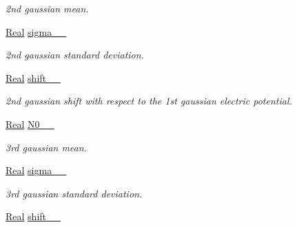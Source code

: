 \begin{DoxyCompactItemize}
\begin{DoxyCompactList}\small\item\em 2nd gaussian mean. \end{DoxyCompactList}\item 
\hypertarget{classParamList_a3ead6e4cc08dc0320e0b98c29e6d9337}{\hyperlink{typedefs_8h_a060b837c3b4486ee35317744156f3da2}{Real} \hyperlink{classParamList_a3ead6e4cc08dc0320e0b98c29e6d9337}{sigma\-\_\-\_\-}}\label{classParamList_a3ead6e4cc08dc0320e0b98c29e6d9337}

\begin{DoxyCompactList}\small\item\em 2nd gaussian standard deviation. \end{DoxyCompactList}\item 
\hypertarget{classParamList_a0f5e1e6350aeec57d0b7dacba5d86230}{\hyperlink{typedefs_8h_a060b837c3b4486ee35317744156f3da2}{Real} \hyperlink{classParamList_a0f5e1e6350aeec57d0b7dacba5d86230}{shift\-\_\-\_\-}}\label{classParamList_a0f5e1e6350aeec57d0b7dacba5d86230}

\begin{DoxyCompactList}\small\item\em 2nd gaussian shift with respect to the 1st gaussian electric potential. \end{DoxyCompactList}\item 
\hypertarget{classParamList_a180b65203622e6c324a5f78bd16ac4d7}{\hyperlink{typedefs_8h_a060b837c3b4486ee35317744156f3da2}{Real} \hyperlink{classParamList_a180b65203622e6c324a5f78bd16ac4d7}{N0\-\_\-\_\-}}\label{classParamList_a180b65203622e6c324a5f78bd16ac4d7}

\begin{DoxyCompactList}\small\item\em 3rd gaussian mean. \end{DoxyCompactList}\item 
\hypertarget{classParamList_ad0e6dd2c004d045b411bf0f0bb0544e2}{\hyperlink{typedefs_8h_a060b837c3b4486ee35317744156f3da2}{Real} \hyperlink{classParamList_ad0e6dd2c004d045b411bf0f0bb0544e2}{sigma\-\_\-\_\-}}\label{classParamList_ad0e6dd2c004d045b411bf0f0bb0544e2}

\begin{DoxyCompactList}\small\item\em 3rd gaussian standard deviation. \end{DoxyCompactList}\item 
\hypertarget{classParamList_a84789797624123c5835390017f5520fe}{\hyperlink{typedefs_8h_a060b837c3b4486ee35317744156f3da2}{Real} \hyperlink{classParamList_a84789797624123c5835390017f5520fe}{shift\-\_\-\_\-}}\label{classParamList_a84789797624123c5835390017f5520fe}


\end{DoxyCompactItemize}
